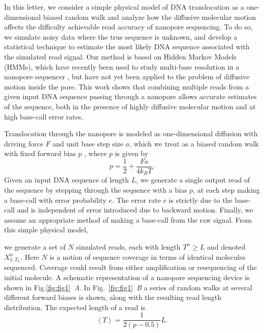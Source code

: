 \documentclass{biophys_letter}
\begin{document}
\begin{multicols}{2}
In this letter, we consider a simple physical model of DNA translocation as a one-dimensional biased random walk and analyze how the diffusive molecular motion affects the difficulty achievable read accuracy of nanopore sequencing.
To do so, we simulate noisy data where the true sequence is unknown, and develop a statistical technique to estimate the most likely DNA sequence associated with the simulated read signal.
Our method is based on Hidden Markov Models (HMMs), which have recently been used to study multi-base resolution in a nanopore sequencer \cite{Timp:2012}, but have not yet been applied to the problem of diffusive motion inside the pore.
This work shows that combining multiple reads from a given input DNA sequence passing through a nanopore allows accurate estimates of the sequence, both in the presence of highly diffusive molecular motion and at high base-call error rates.

Translocation through the nanopore is modeled as one-dimensional diffusion with driving force $F$ and unit base step size $a$, which we treat as a biased random walk with fixed forward bias $p$ \cite{Berg:1993}, where $p$ is given by
\begin{equation}
p = \frac{1}{2} + \frac{Fa}{4k_{B}T}.
\end{equation}
Given an input DNA sequence of length $L$, we generate a single output read of the sequence by stepping through the sequence with a bias $p$, at each step making a base-call with error probability $e$.
The error rate $e$ is strictly due to the base-call and is independent of error introduced due to backward motion. 
Finally, we assume an appropriate method of making a base-call from the raw signal.
From this simple physical model,\end{multicols}\twocolumn we generate a set of $N$ simulated reads, each with length $T^{n} \ge L$ and denoted $X^n_{1:T_n}$.
Here $N$ is a notion of sequence coverage in terms of identical molecules sequenced.
Coverage could result from either amplification or resequencing of the initial molecule.
A schematic representation of a nanopore sequencing device is shown in Fig.\ref{fig:fig1}\emph{~A}.
In Fig.~\ref{fig:fig1}\emph{~B} a series of random walks at several different forward biases is shown, along with the resulting read length distribution.
The expected length of a read is 
\begin{equation}
  \left\langle T  \right\rangle = \frac{1}{2(p-0.5)} L.
\end{equation}
\end{document}
